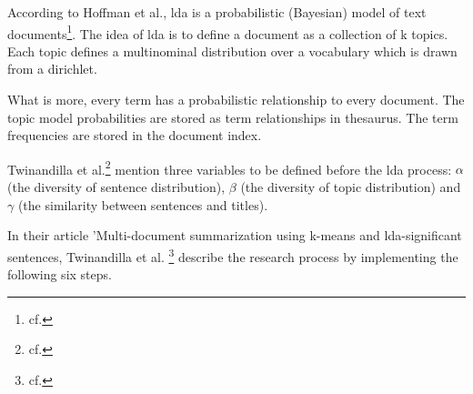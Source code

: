 According to Hoffman et al., \gls{lda} is a probabilistic (Bayesian) model of text documents\footnote{cf.\autocite{hoffman_2010}}. The idea of \gls{lda} is to define a document as a collection of k topics. Each topic defines a multinominal distribution over a vocabulary which is drawn from a dirichlet.

What is more, every term has a probabilistic relationship to every document. The topic model probabilities are stored as term relationships in thesaurus. The term frequencies are stored in the document index.

Twinandilla et al.\footnote{cf.\autocite{twinandilla_2018}} mention three variables to be defined before the \gls{lda} process: $\alpha$ (the diversity of sentence distribution), $\beta$ (the diversity of topic distribution) and $\gamma$ (the similarity between sentences and titles).

In their article 'Multi-document summarization using k-means and \gls{lda}-significant sentences, Twinandilla et al. \footnote{cf.\autocite{twinandilla_2018}} describe the research process by implementing the following six steps.

